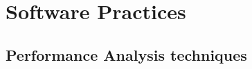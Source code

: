 \section{Software Practices}\label{sec:software}


 \subsection{Performance Analysis techniques}
 
 


